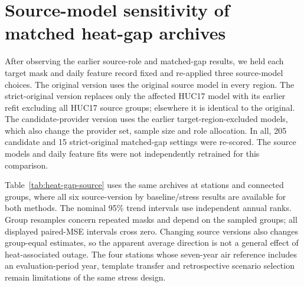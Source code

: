 \section{Source-model sensitivity of matched heat-gap archives}
After observing the earlier source-role and matched-gap results, we held each target mask and daily feature record fixed and re-applied three source-model choices. The original version uses the original source model in every region. The strict-original version replaces only the affected HUC17 model with its earlier refit excluding all HUC17 source groups; elsewhere it is identical to the original. The candidate-provider version uses the earlier target-region-excluded models, which also change the provider set, sample size and role allocation. In all, 205 candidate and 15 strict-original matched-gap settings were re-scored. The source models and daily feature fits were not independently retrained for this comparison.

Table~\ref{tab:heat-gap-source} uses the same \HGRCases{} archives at \HGRStations{} stations and \HGRGroups{} connected groups, where all six source-version by baseline/stress results are available for both methods. The nominal 95\% trend intervals use independent annual ranks. Group resamples concern repeated masks and depend on the sampled groups; all displayed paired-MSE intervals cross zero. Changing source versions also changes group-equal estimates, so the apparent average direction is not a general effect of heat-associated outage. The four stations whose seven-year air reference includes an evaluation-period year, template transfer and retrospective scenario selection remain limitations of the same stress design.

\begin{table}[ht]\caption{Matched-gap source sensitivity, baseline / stress on the same two-method, six-way common cohort. RMSE is $^{\circ}$C per decade; group-equal paired MSE difference and group-resampled intervals are $({}^{\circ}\mathrm{C}/\mathrm{decade})^2$.}\label{tab:heat-gap-source}\centering\small
{}\end{table}

